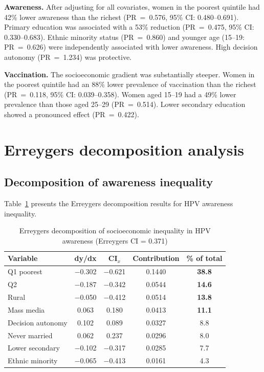 \textbf{Awareness.} After adjusting for all covariates, women in the poorest quintile had 42\% lower awareness than the richest (PR~=~0.576, 95\% CI: 0.480--0.691). Primary education was associated with a 53\% reduction (PR~=~0.475, 95\% CI: 0.330--0.683). Ethnic minority status (PR~=~0.860) and younger age (15--19: PR~=~0.626) were independently associated with lower awareness. High decision autonomy (PR~=~1.234) was protective.

\textbf{Vaccination.} The socioeconomic gradient was substantially steeper. Women in the poorest quintile had an 88\% lower prevalence of vaccination than the richest (PR~=~0.118, 95\% CI: 0.039--0.358). Women aged 15--19 had a 49\% lower prevalence than those aged 25--29 (PR~=~0.514). Lower secondary education showed a pronounced effect (PR~=~0.422).

\section{Erreygers decomposition analysis}

\subsection{Decomposition of awareness inequality}

Table~\ref{tab:decomp_awareness} presents the Erreygers decomposition results for HPV awareness inequality.

\begin{table}[htbp]
\caption{Erreygers decomposition of socioeconomic inequality in HPV awareness (Erreygers CI = 0.371)}
\centering
\small
\begin{tabular}{|p{3.5cm}|c|c|c|c|}
\hline
\textbf{Variable} & \textbf{dy/dx} & \textbf{CI$_x$} & \textbf{Contribution} & \textbf{\% of total} \\
\hline
Q1 poorest & $-$0.302 & $-$0.621 & 0.1440 & \textbf{38.8} \\
Q2 & $-$0.187 & $-$0.342 & 0.0544 & \textbf{14.6} \\
Rural & $-$0.050 & $-$0.412 & 0.0514 & \textbf{13.8} \\
Mass media & 0.063 & 0.180 & 0.0413 & \textbf{11.1} \\
Decision autonomy & 0.102 & 0.089 & 0.0327 & 8.8 \\
Never married & 0.062 & 0.237 & 0.0296 & 8.0 \\
Lower secondary & $-$0.102 & $-$0.317 & 0.0285 & 7.7 \\
Ethnic minority & $-$0.065 & $-$0.413 & 0.0161 & 4.3 \\
\hline
\end{tabular}
\label{tab:decomp_awareness}
\end{table}


